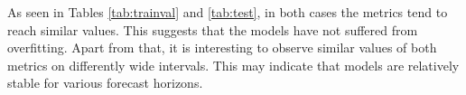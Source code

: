 As seen in Tables \ref{tab:trainval} and \ref{tab:test}, in both cases the metrics tend to reach similar values. This suggests that the models have not
suffered from overfitting. Apart from that, it is interesting to observe similar values of both metrics on differently wide intervals.
This may indicate that models are relatively stable for various forecast horizons.

